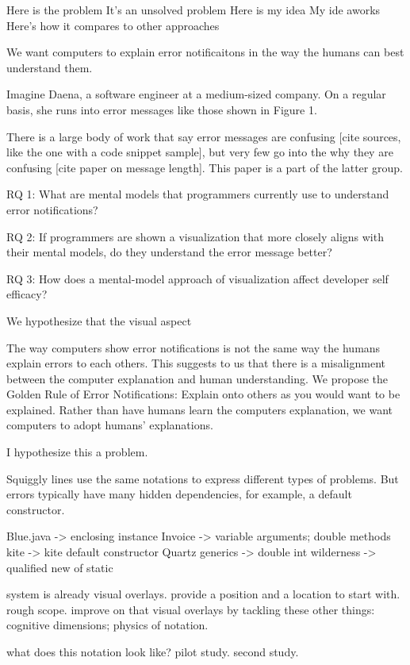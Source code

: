 \documentclass[conference]{IEEEtran}
\begin{document}
Here is the problem
It's an unsolved problem
Here is my idea
My ide aworks
Here's how it compares to other approaches

We want computers to explain error notificaitons in the way the humans can best understand them.

Imagine Daena, a software engineer at a medium-sized company.  On a regular basis, she runs into error messages like those shown in Figure 1.  

There is a large body of work that say error messages are confusing [cite sources, like the one with a code snippet sample], but very few go into the why they are confusing [cite paper on message length].  This paper is a part of the latter group.


RQ 1: What are mental models that programmers currently use to understand error notifications?

RQ 2: If programmers are shown a visualization that more closely aligns with their mental models, do they understand the error message better?

RQ 3: How does a mental-model approach of visualization affect developer self efficacy?

We hypothesize that the visual aspect 

The way computers show error notifications is not the same way the humans explain errors to each others.  This suggests to us that there is a misalignment between the computer explanation and human understanding.  We propose the Golden Rule of Error Notifications: Explain onto others as you would want to be explained.  Rather than have humans learn the computers explanation, we want computers to adopt humans' explanations.


I hypothesize this a problem.

Squiggly lines use the same notations to express different types of problems. But errors typically have many hidden dependencies, for example, a default constructor.

Blue.java -> enclosing instance
Invoice -> variable arguments; double methods
kite -> kite default constructor
Quartz generics ->  double int
wilderness -> qualified new of static

system is already visual overlays. provide a position and a location to start with. rough scope. improve on that visual overlays by tackling these other things: cognitive dimensions; physics of notation.

what does this notation look like? pilot study. second study.
\end{document}
